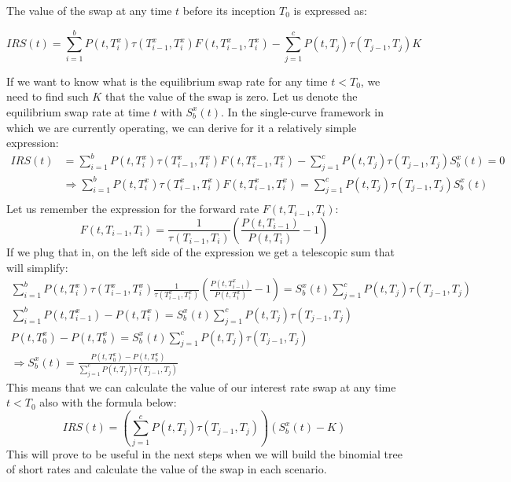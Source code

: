 \documentclass[titlepage, 12pt]{article}
\begin{document}
	The value of the swap at any time $t$ before its inception $T_0$ is expressed as: 
	
	\begin{equation}
		IRS(t) = \sum_{i=1}^b P(t,T_i^x)\tau(T_{i-1}^x,T_i^x)F(t,T_{i-1}^x,T_i^x) - \sum_{j=1}^c P(t,T_j)\tau(T_{j-1},T_j)K
	\end{equation}
	
	If we want to know what is the equilibrium swap rate for any time $t<T_0$, we need to find such $K$ that the value of the swap is zero. Let us denote the equilibrium swap rate at time $t$ with $S_b^x(t)$. In the single-curve framework in which we are currently operating, we can derive for it a relatively simple expression:
	\begin{equation}\label{eq:irs}
		\begin{split}
			IRS(t) &= \sum_{i=1}^b P(t,T_i^x)\tau(T_{i-1}^x,T_i^x)F(t,T_{i-1}^x,T_i^x) - \sum_{j=1}^c P(t,T_j)\tau(T_{j-1},T_j)S_b^x(t) = 0 \\
			&\Rightarrow \sum_{i=1}^b P(t,T_i^x)\tau(T_{i-1}^x,T_i^x)F(t,T_{i-1}^x,T_i^x) = \sum_{j=1}^c P(t,T_j)\tau(T_{j-1},T_j)S_b^x(t)\\
		\end{split}
	\end{equation}
	Let us remember the expression for the forward rate $F(t,T_{i-1},T_i)$: 
	\begin{equation}
		F(t,T_{i-1},T_i) = \frac{1}{\tau(T_{i-1},T_i)}\left(\frac{P(t,T_{i-1})}{P(t,T_i)} - 1\right)
	\end{equation}
	If we plug that in, on the left side of the expression we get a telescopic sum that will simplify:
	\begin{equation}
		\begin{gathered}
			\sum_{i=1}^b P(t,T_i^x)\tau(T_{i-1}^x,T_i^x)\frac{1}{\tau(T_{i-1}^x,T_i^x)}\left(\frac{P(t,T_{i-1}^x)}{P(t,T_i^x)} - 1\right) = S_b^x(t)\sum_{j=1}^c P(t,T_j)\tau(T_{j-1},T_j)\\
			\sum_{i=1}^b P(t,T_{i-1}^x) - P(t,T_i^x)= S_b^x(t)\sum_{j=1}^c P(t,T_j)\tau(T_{j-1},T_j)\\
			P(t,T_0^x) - P(t,T_b^x) = S_b^x(t)\sum_{j=1}^c P(t,T_j)\tau(T_{j-1},T_j) \\
			\Rightarrow S_b^x(t) = \frac{P(t,T_0^x) - P(t,T_b^x)}{\sum_{j=1}^c P(t,T_j)\tau(T_{j-1},T_j)}
		\end{gathered}
	\end{equation}
	This means that we can calculate the value of our interest rate swap at any time $t<T_0$ also with the formula below:
	\begin{equation}
		IRS(t) = \left(\sum_{j=1}^c P(t,T_j)\tau(T_{j-1},T_j)\right) \left( S_b^x(t) - K \right)
	\end{equation}
	This will prove to be useful in the next steps when we will build the binomial tree of short rates and calculate the value of the swap in each scenario. 
	
\end{document}

